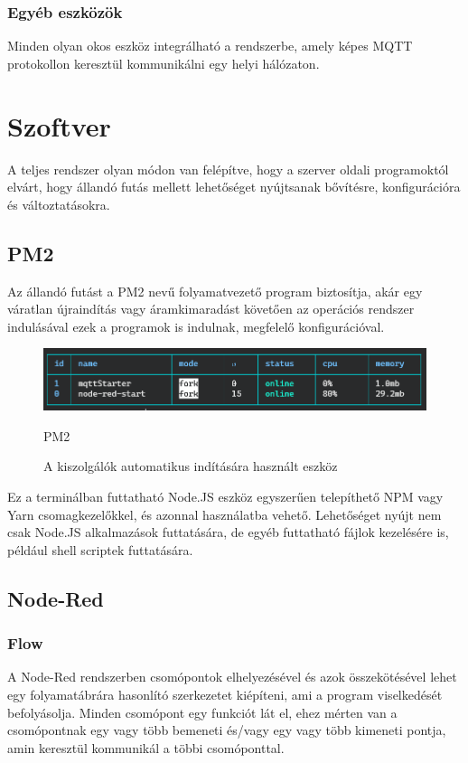 \documentclass[
]{thesis-ekf}
\theoremstyle{definition}
\theoremstyle{remark}
\begin{document}
\subsection{Egyéb eszközök}
Minden olyan okos eszköz integrálható a rendszerbe, amely képes MQTT protokollon keresztül kommunikálni egy helyi hálózaton.



\chapter{Szoftver}
A teljes rendszer olyan módon van felépítve, hogy a szerver oldali programoktól elvárt, hogy állandó futás mellett lehetőséget 
nyújtsanak bővítésre, konfigurációra és változtatásokra. 
\section{PM2}
Az állandó futást a PM2\cite{pm2} nevű folyamatvezető program biztosítja, akár egy váratlan újraindítás vagy áramkimaradást követően az operációs rendszer indulásával ezek a programok is indulnak, megfelelő konfigurációval.

\begin{figure}[h]
	\includegraphics[width=1\textwidth]{images/pm2.png}
	\caption{PM2\cite{pm2}}
	\caption{A kiszolgálók automatikus indítására használt eszköz}
\end{figure}

Ez a terminálban futtatható Node.JS eszköz egyszerűen telepíthető NPM vagy Yarn csomagkezelőkkel, és azonnal használatba vehető.
Lehetőséget nyújt nem csak Node.JS alkalmazások futtatására, de egyéb futtatható fájlok kezelésére is, például shell scriptek futtatására.

\section{Node-Red}
\subsection{Flow}
A Node-Red rendszerben csomópontok elhelyezésével és azok összekötésével lehet egy folyamatábrára hasonlító szerkezetet kiépíteni, 
ami a program viselkedését befolyásolja. Minden csomópont egy funkciót lát el, ehez mérten van a csomópontnak 
egy vagy több bemeneti és/vagy egy vagy több kimeneti pontja, amin keresztül kommunikál a többi csomóponttal.
\end{document}
